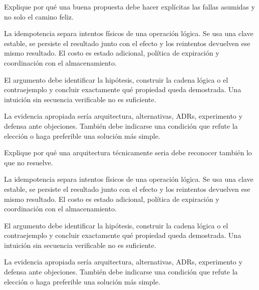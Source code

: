 \documentclass[variant=guia,cover=institutional,mode=screen]{ua-engineering-v6-article}
\begin{document}
\begin{uaexercise}
Explique por qué una buena propuesta debe hacer explícitas las fallas asumidas y no solo el camino feliz.
\end{uaexercise}
\begin{uaanswer}
La idempotencia separa intentos físicos de una operación lógica. Se usa una clave estable, se persiste el resultado junto con el efecto y los reintentos devuelven ese mismo resultado. El costo es estado adicional, política de expiración y coordinación con el almacenamiento.

El argumento debe identificar la hipótesis, construir la cadena lógica o el contraejemplo y concluir exactamente qué propiedad queda demostrada. Una intuición sin secuencia verificable no es suficiente.

La evidencia apropiada sería arquitectura, alternativas, ADRs, experimento y defensa ante objeciones. También debe indicarse una condición que refute la elección o haga preferible una solución más simple.
\end{uaanswer}

\begin{uaexercise}
Explique por qué una arquitectura técnicamente seria debe reconocer también lo que no resuelve.
\end{uaexercise}
\begin{uaanswer}
La idempotencia separa intentos físicos de una operación lógica. Se usa una clave estable, se persiste el resultado junto con el efecto y los reintentos devuelven ese mismo resultado. El costo es estado adicional, política de expiración y coordinación con el almacenamiento.

El argumento debe identificar la hipótesis, construir la cadena lógica o el contraejemplo y concluir exactamente qué propiedad queda demostrada. Una intuición sin secuencia verificable no es suficiente.

La evidencia apropiada sería arquitectura, alternativas, ADRs, experimento y defensa ante objeciones. También debe indicarse una condición que refute la elección o haga preferible una solución más simple.
\end{uaanswer}
\end{document}
